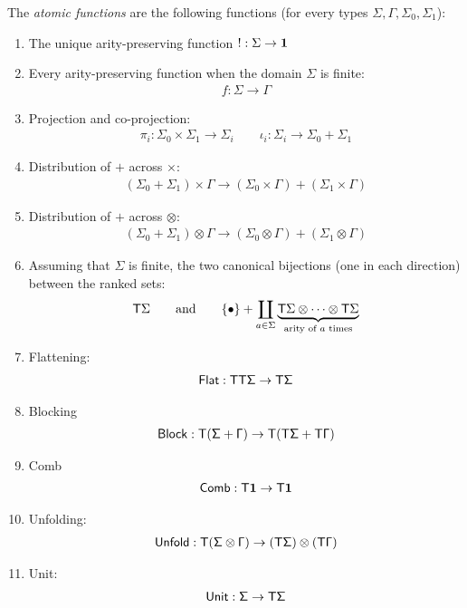 \begin{definition}\label{def:atomic-functions} The \emph{atomic functions} are the following functions (for every types $\Sigma,\Gamma,\Sigma_0,\Sigma_1$): 
\begin{enumerate}
    \item The unique arity-preserving function $! : \Sigma \to \mathbf{1}$
    \item Every arity-preserving function when the domain $\Sigma$ is finite:
    \begin{align*}
        f : \Sigma \to \Gamma
    \end{align*}
    \item Projection and co-projection:
    \begin{align*}
        \pi_i : \Sigma_0 \times \Sigma_1 \to \Sigma_i \qquad \iota_i : \Sigma_i \to \Sigma_0 + \Sigma_1
    \end{align*}
    \item Distribution of $+$ across $\times$:
\begin{align*}
    (\Sigma_0 + \Sigma_1 ) \times \Gamma \to (\Sigma_0 \times \Gamma) + (\Sigma_1 \times \Gamma)
\end{align*}
\item Distribution of $+$ across $\otimes$:
\begin{align*}
    (\Sigma_0 + \Sigma_1 ) \otimes \Gamma \to (\Sigma_0 \otimes \Gamma) + (\Sigma_1 \otimes \Gamma)
\end{align*}
\item Assuming that $\Sigma$ is finite, the two canonical bijections (one in each direction) between the ranked sets:
 \begin{align*}
    \mathsf T \Sigma \qquad \text{and} \qquad    \{\bullet\} + \coprod_{a \in \Sigma} \underbrace{\mathsf T \Sigma \otimes \cdots \otimes \mathsf T \Sigma}_{\text{arity of $a$ times}}
\end{align*}
\item Flattening:
\begin{align*}
    \sf{Flat}: \mathsf T \mathsf T \Sigma \to \mathsf T \Sigma
\end{align*}
\item Blocking
    \begin{align*}
        \sf{Block}:\mathsf T (\Sigma + \Gamma) \to \mathsf T (\mathsf T \Sigma + \mathsf T \Gamma)
    \end{align*}
    \item Comb
    \begin{align*}
        \sf{Comb}:\mathsf T \mathbf{1} \to \mathsf T \mathbf{1}
    \end{align*}
    \item Unfolding: 
\begin{align*}
    \sf{Unfold}:\mathsf T (\Sigma \otimes \Gamma) \to (\mathsf T \Sigma) \otimes (\mathsf T \Gamma)
\end{align*}
    \item Unit:
\begin{align*}
    \sf{Unit}:\Sigma  \to \mathsf T \Sigma
\end{align*}


\end{enumerate}
\end{definition}
